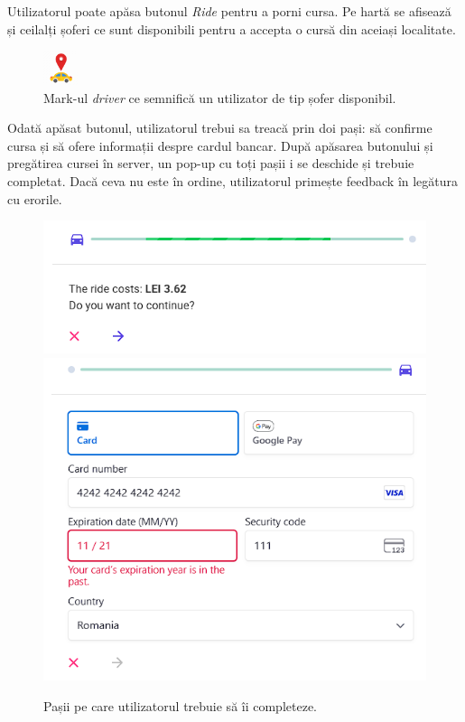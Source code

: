 Utilizatorul poate apăsa butonul \textit{Ride} pentru a porni cursa.
Pe hartă se afisează și ceilalți șoferi ce sunt disponibili pentru a accepta o cursă din aceiași localitate.

\begin{figure}[H]
    \centering
    \includegraphics[width=1cm]{Assets/driver.png}
    \caption{Mark-ul \textit{driver} ce semnifică un utilizator de tip șofer disponibil.}
    \label{fig:driverPin}
\end{figure}

Odată apăsat butonul, utilizatorul trebui sa treacă prin doi pași: să confirme cursa și să ofere informații despre cardul bancar. 
După apăsarea butonului și pregătirea cursei în server, un pop-up 
cu toți pașii i se deschide și trebuie completat. Dacă ceva nu este în ordine, utilizatorul primește
feedback în legătura cu erorile.

\begin{figure}[H]
    \centering
    \includegraphics[width=14cm]{Assets/acceptRideUser.png}
    \includegraphics[width=14cm]{Assets/card.png}
    \caption{Pașii pe care utilizatorul trebuie să îi completeze.}
    \label{fig:paymentStep12}
\end{figure}

